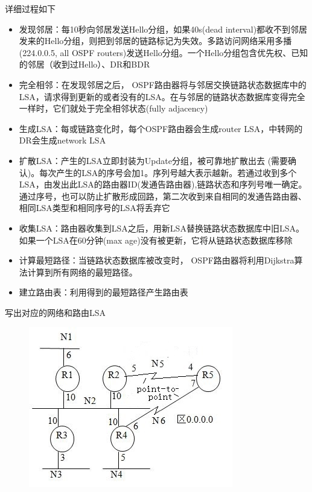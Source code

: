 详细过程如下
\begin{itemize}
	\item 发现邻居：每10秒向邻居发送Hello分组，如果40s(dead interval)都收不到邻居发来的Hello分组，则把到邻居的链路标记为失效。多路访问网络采用多播(224.0.0.5, all OSPF routers)发送Hello分组。一个Hello分组包含优先权、已知的邻居（收到过Hello）、DR和BDR
	\item 完全相邻：在发现邻居之后， OSPF路由器将与邻居交换链路状态数据库中的LSA，请求得到更新的或者没有的LSA。在与邻居的链路状态数据库变得完全一样时，它们就处于完全相邻状态(fully adjacency)
	\item 生成LSA：每或链路变化时，每个OSPF路由器会生成router LSA，中转网的DR会生成network LSA
	\item 扩散LSA：产生的LSA立即封装为Update分组，被可靠地扩散出去 (需要确认)。每次产生的LSA的序号会加1。序列号越大表示越新。若通过收到多个LSA，由发出此LSA的路由器ID(发通告路由器),链路状态和序列号唯一确定。通过序号，也可以防止扩散形成回路，第二次收到来自相同的发通告路由器、相同LSA类型和相同序号的LSA将丢弃它
	\item 收集LSA：路由器收集到LSA之后，用新LSA替换链路状态数据库中旧LSA。如果一个LSA在60分钟(max age)没有被更新，它将从链路状态数据库移除
	\item 计算最短路径：当链路状态数据库被改变时， OSPF路由器将利用Dijkstra算法计算到所有网络的最短路径。
	\item 建立路由表：利用得到的最短路径产生路由表
\end{itemize}
\begin{example}
	写出对应的网络和路由LSA
	\begin{figure}[H]
		\centering
		\includegraphics[width=0.4\linewidth]{fig/ospf_example.jpg}
	\end{figure}
\end{example}
